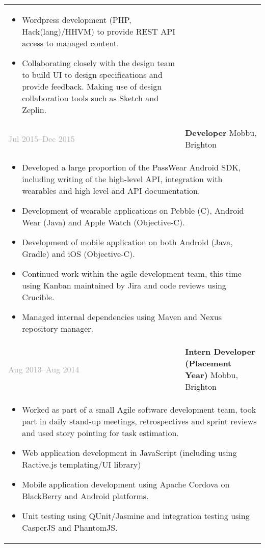 \documentclass{article}
\newenvironment{exptable}{
  \begin{longtable}{lp{0.8\textwidth}}
  }{
  \end{longtable}
}
\begin{document}
\begin{exptable}
{\begin{itemize}
          \item Wordpress development (PHP, Hack(lang)/HHVM) to provide REST API access to managed content.
          \item Collaborating closely with the design team to build UI to design specifications and provide feedback. Making use of design collaboration tools such as Sketch and Zeplin.
        \end{itemize}
      } \\
      \textcolor{darkgray}{Jul 2015--Dec 2015} & \textbf{Developer} Mobbu, Brighton \\
      \multicolumn{2}{p{\textwidth}}{
        \begin{itemize}
          \item Developed a large proportion of the PassWear Android SDK, including writing of the high-level API, integration with wearables and high level and API documentation.
          \item Development of wearable applications on Pebble (C), Android Wear (Java) and Apple Watch (Objective-C).
          \item Development of mobile application on both Android (Java, Gradle) and iOS (Objective-C).
          \item Continued work within the agile development team, this time using Kanban maintained by Jira and code reviews using Crucible.
          \item Managed internal dependencies using Maven and Nexus repository manager.
        \end{itemize}
      } \\
      \textcolor{darkgray}{Aug 2013--Aug 2014} & \textbf{Intern Developer (Placement Year)} Mobbu, Brighton \\
      \multicolumn{2}{p{\textwidth}}{
        \begin{itemize}
          \item Worked as part of a small Agile software development team, took part in daily stand-up meetings, retrospectives and sprint reviews and used story pointing for task estimation.
          \item Web application development in JavaScript (including using Ractive.js templating/UI library)
          \item Mobile application development using Apache Cordova on BlackBerry and Android platforms.
          \item Unit testing using QUnit/Jasmine and integration testing using CasperJS and PhantomJS.

\end{itemize}}
\end{exptable}
\end{document}
